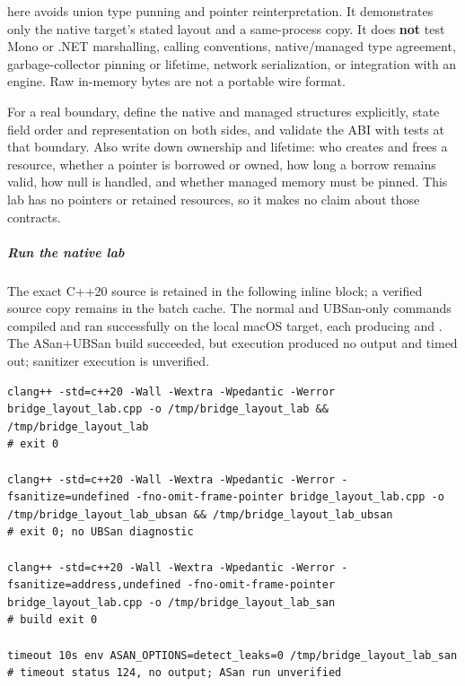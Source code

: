  here avoids union type punning and pointer reinterpretation. It demonstrates only the native target's stated layout and a same-process copy. It does \textbf{not} test Mono or .NET marshalling, calling conventions, native/managed type agreement, garbage-collector pinning or lifetime, network serialization, or integration with an engine. Raw in-memory bytes are not a portable wire format.

For a real boundary, define the native and managed structures explicitly, state field order and representation on both sides, and validate the ABI with tests at that boundary. Also write down ownership and lifetime: who creates and frees a resource, whether a pointer is borrowed or owned, how long a borrow remains valid, how null is handled, and whether managed memory must be pinned. This lab has no pointers or retained resources, so it makes no claim about those contracts.

\subparagraph{Run the native lab}\label{06-engine-ii-ch040-run-the-native-lab}

\hypertarget{06-engine-ii-ch040-run-the-native-lab}{}

The exact C++20 source is retained in the following inline block; a verified source copy remains in the batch cache. The normal and UBSan-only commands compiled and ran successfully on the local macOS target, each producing  and . The ASan+UBSan build succeeded, but execution produced no output and timed out; sanitizer execution is unverified.

\begin{verbatim}
clang++ -std=c++20 -Wall -Wextra -Wpedantic -Werror bridge_layout_lab.cpp -o /tmp/bridge_layout_lab && /tmp/bridge_layout_lab
# exit 0

clang++ -std=c++20 -Wall -Wextra -Wpedantic -Werror -fsanitize=undefined -fno-omit-frame-pointer bridge_layout_lab.cpp -o /tmp/bridge_layout_lab_ubsan && /tmp/bridge_layout_lab_ubsan
# exit 0; no UBSan diagnostic

clang++ -std=c++20 -Wall -Wextra -Wpedantic -Werror -fsanitize=address,undefined -fno-omit-frame-pointer bridge_layout_lab.cpp -o /tmp/bridge_layout_lab_san
# build exit 0

timeout 10s env ASAN_OPTIONS=detect_leaks=0 /tmp/bridge_layout_lab_san
# timeout status 124, no output; ASan run unverified
\end{verbatim}

